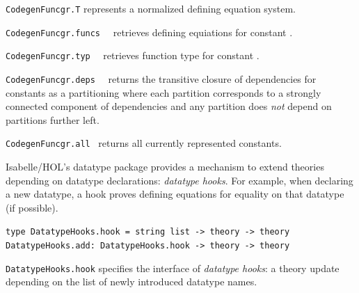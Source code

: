 \begin{isabellebody}
\begin{isamarkuptext}
  \begin{description}

  \item \verb|CodegenFuncgr.T| represents
    a normalized defining equation system.

  \item \verb|CodegenFuncgr.funcs|~~
    retrieves defining equiations for constant .

  \item \verb|CodegenFuncgr.typ|~~
    retrieves function type for constant .

  \item \verb|CodegenFuncgr.deps|~~
    returns the transitive closure of dependencies for
    constants  as a partitioning where each partition
    corresponds to a strongly connected component of
    dependencies and any partition does \emph{not}
    depend on partitions further left.

  \item \verb|CodegenFuncgr.all|~
    returns all currently represented constants.

  \end{description}%
\end{isamarkuptext}%
\isamarkuptrue%
%
\endisatagmlref
{\isafoldmlref}%
%
\isadelimmlref
%
\endisadelimmlref
%
\isamarkuptrue%
%
\begin{isamarkuptext}%
Isabelle/HOL's datatype package provides a mechanism to
  extend theories depending on datatype declarations:
  \emph{datatype hooks}.  For example, when declaring a new
  datatype, a hook proves defining equations for equality on
  that datatype (if possible).%
\end{isamarkuptext}%
\isamarkuptrue%
%
\isadelimmlref
%
\endisadelimmlref
%
\isatagmlref
%
\begin{isamarkuptext}%
\begin{mldecls}
  \verb|type DatatypeHooks.hook = string list -> theory -> theory| \\
  \verb|DatatypeHooks.add: DatatypeHooks.hook -> theory -> theory|
  \end{mldecls}

  \begin{description}

  \item \verb|DatatypeHooks.hook| specifies the interface
     of \emph{datatype hooks}: a theory update
     depending on the list of newly introduced
     datatype names.


\end{description}
\end{isamarkuptext}
\end{isabellebody}
